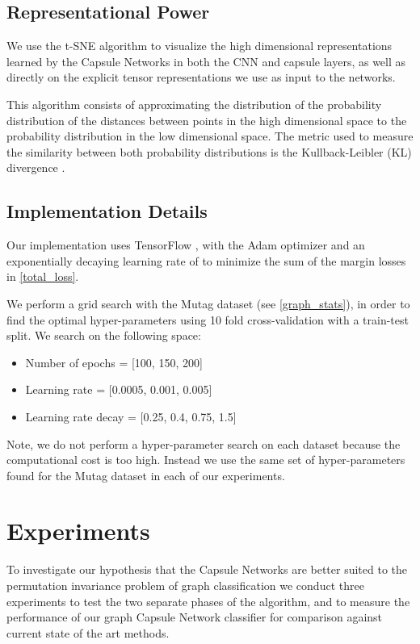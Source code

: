 \documentclass[conference]{IEEEtran}
\begin{document}
\subsection{Representational Power} 
We use the t-SNE algorithm \cite{maaten2008visualizing} to visualize the high dimensional representations learned by the Capsule Networks in both the CNN and capsule layers, as well as directly on the explicit tensor representations we use as input to the networks.

This algorithm consists of approximating the distribution of the probability distribution of the distances between points in the high dimensional space to the probability distribution in the low dimensional space. The metric used to measure the similarity between both probability distributions is the Kullback-Leibler (KL) divergence \cite{hershey2007approximating}.


\subsection{Implementation Details}
Our implementation uses TensorFlow \cite{abadi2016tensorflow}, with the Adam optimizer \cite{kingma2014adam} and an exponentially decaying learning rate of  to minimize the sum of the margin losses in \autoref{total_loss}.

We perform a grid search with the Mutag dataset (see \autoref{graph_stats}), in order to find the optimal hyper-parameters using 10 fold cross-validation with a  train-test split. We search on the following space:
\begin{itemize}
    \item Number of epochs = [100, 150, 200]
    \item Learning rate = [0.0005, 0.001, 0.005]
    \item Learning rate decay = [0.25, 0.4, 0.75, 1.5]
\end{itemize}
Note, we do not perform a hyper-parameter search on each dataset because the computational cost is too high. Instead we use the same set of hyper-parameters found for the Mutag dataset in each of our experiments.

\section{Experiments}

To investigate our hypothesis that the Capsule Networks are better suited to the permutation invariance problem of graph classification we conduct three experiments to test the two separate phases of the algorithm, and to measure the performance of our graph Capsule Network classifier for comparison against current state of the art methods.
\end{document}

